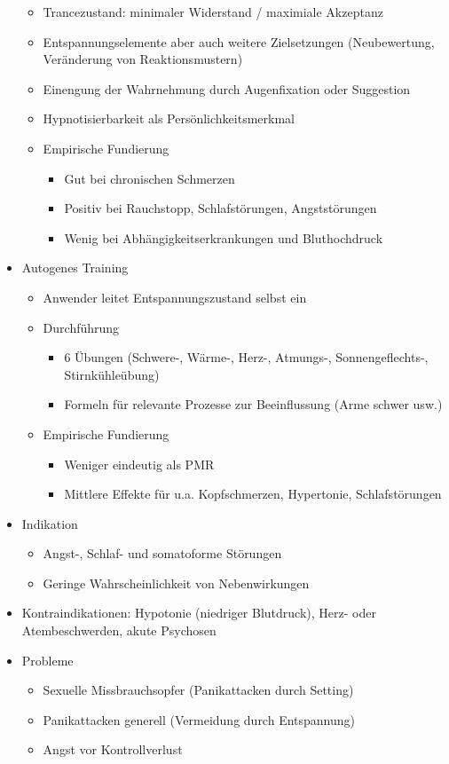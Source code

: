 \documentclass[11pt, paper=a4, twocolumn]{scrartcl}
\begin{document}
\begin{itemize}
\begin{itemize}
					\item Trancezustand: minimaler Widerstand / maximiale Akzeptanz
					\item Entspannungselemente aber auch weitere Zielsetzungen (Neubewertung, Veränderung von Reaktionsmustern)
					\item Einengung der Wahrnehmung durch Augenfixation oder Suggestion
					\item Hypnotisierbarkeit als Persönlichkeitsmerkmal
					\item Empirische Fundierung
						\begin{itemize}
							\item Gut bei chronischen Schmerzen
							\item Positiv bei Rauchstopp, Schlafstörungen, Angststörungen
							\item Wenig bei Abhängigkeitserkrankungen und Bluthochdruck
						\end{itemize}
				\end{itemize}
			\item Autogenes Training
				\begin{itemize}
					\item Anwender leitet Entspannungszustand selbst ein
					\item Durchführung
						\begin{itemize}
							\item 6 Übungen (Schwere-, Wärme-, Herz-, Atmungs-, Sonnengeflechts-, Stirnkühleübung)
							\item Formeln für relevante Prozesse zur Beeinflussung (Arme schwer usw.)
						\end{itemize}
					\item Empirische Fundierung
						\begin{itemize}
							\item Weniger eindeutig als PMR
							\item Mittlere Effekte für u.a. Kopfschmerzen, Hypertonie, Schlafstörungen
						\end{itemize}
				\end{itemize}
			\item Indikation
				\begin{itemize}
					\item Angst-, Schlaf- und somatoforme Störungen
					\item Geringe Wahrscheinlichkeit von Nebenwirkungen
				\end{itemize}
			\item Kontraindikationen: Hypotonie (niedriger Blutdruck), Herz- oder Atembeschwerden, akute Psychosen
			\item Probleme
				\begin{itemize}
					\item Sexuelle Missbrauchsopfer (Panikattacken durch Setting)
					\item Panikattacken generell (Vermeidung durch Entspannung)
					\item Angst vor Kontrollverlust
				\end{itemize}
		\end{itemize}
\end{document}
